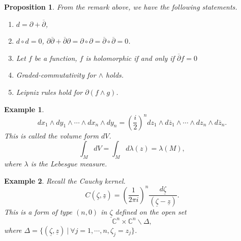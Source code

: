 \documentclass{article}
\newtheorem{proposition}{Proposition}[section]
\newtheorem{example}{Example}[section]
\newcommand{\C}[0]{\mathbb{C}}
\newcommand{\sep}[0]{\:|\:}
\begin{document}
\begin{proposition}
  From the remark above, we have the following statements.
  \begin{enumerate}[1).]
    \item $d = \partial +\overline{\partial}$,
    \item $d\circ d = 0$, $\partial\overline{\partial}+\overline{\partial}\partial = \partial\circ\partial = \overline{\partial}\circ\overline{\partial}= 0$.
    \item Let $f$ be a function, $f$ is holomorphic if and only if $\overline{\partial}f=0$
    \item Graded-commutativity for $\wedge$ holds. %
    \item Leipniz rules hold for $\partial (f\wedge g)$.
  \end{enumerate}
\end{proposition}

\begin{example}
  \begin{equation*}
    dx_1\wedge dy_1\wedge\cdots\wedge dx_n\wedge dy_n = \left({\frac i {2}}\right)^n dz_1\wedge d\overline{z}_1\wedge\cdots\wedge dz_n\wedge d\overline{z}_n.
  \end{equation*}
  This is called the volume form $dV$. 
  \begin{equation*}
    \int_MdV = \int_M d\lambda(z) = \lambda(M),
  \end{equation*}
  where $\lambda$ is the Lebesgue measure.
\end{example}

\begin{example} Recall the Cauchy kernel.
  \begin{equation*}
    C(\underline{\zeta},\underline{z}) = \left({\frac 1 {2\pi i}}\right)^n {\frac {d\underline{\zeta}} {(\underline{\zeta}-\underline{z})}}.
  \end{equation*}
  This is a form of type $(n,0)$ in $\underline{\zeta}$ defined on the open set
  \begin{equation*}
    \C^n\times \C^n \backslash \Delta,
  \end{equation*}
  where $\Delta = \{(\underline{\zeta},\underline{z})\sep \forall j=1,\cdots,n,\zeta_j = z_j\}$.
\end{example}\
\end{document}
